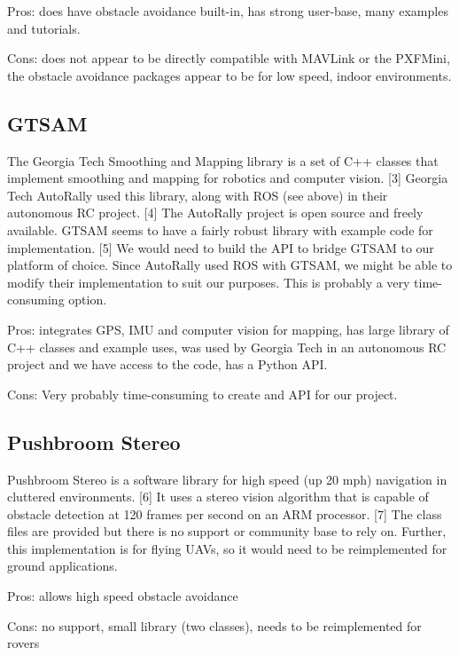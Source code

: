 \documentclass[compsoc,draftclsnofoot,onecolumn,10pt]{IEEEtran}
\begin{document}
Pros: does have obstacle avoidance built-in, has strong user-base, many examples
and tutorials.

Cons: does not appear to be directly compatible with MAVLink or the PXFMini, the
obstacle avoidance packages appear to be for low speed, indoor environments.

\subsection{GTSAM}
The Georgia Tech Smoothing and Mapping library is a set of C++ classes that
implement smoothing and mapping for robotics and computer vision. [3] Georgia
Tech AutoRally used this library, along with ROS (see above) in their autonomous RC
project. [4] The AutoRally project is open source and freely available. GTSAM
seems to have a fairly robust library with example code for implementation. [5]
We would need to build the API to bridge GTSAM to our platform of choice. Since
AutoRally used ROS with GTSAM, we might be able to modify their implementation
to suit our purposes. This is probably a very time-consuming option.

Pros: integrates GPS, IMU and computer vision for mapping, has large library of
C++ classes and example uses, was used by Georgia Tech in an autonomous RC
project and we have access to the code, has a Python API.

Cons: Very probably time-consuming to create and API for our project.

\subsection{Pushbroom Stereo}
Pushbroom Stereo is a software library for high speed (up 20 mph) navigation in
cluttered environments. [6] It uses a stereo vision algorithm that is capable of
obstacle detection at 120 frames per second on an ARM processor. [7] The class
files are provided but there is no support or community base to rely on.
Further, this implementation is for flying UAVs, so it would need to be
reimplemented for ground applications.

Pros: allows high speed obstacle avoidance

Cons: no support, small library (two classes), needs to be reimplemented for
rovers
\end{document}
